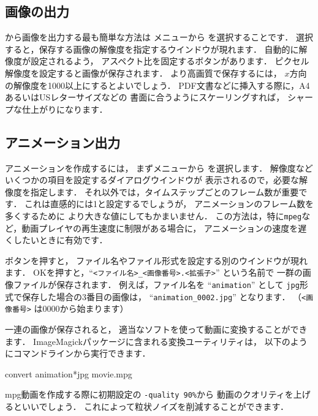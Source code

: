 \subsection{画像の出力}
\label{ssec:6.1.9}
から画像を出力する最も簡単な方法は
メニューから
%
%
を選択することです．
選択すると，保存する画像の解像度を指定するウインドウが現れます．
自動的に解像度が設定されるよう，
アスペクト比を固定するボタンがあります．
ピクセル解像度を設定すると画像が保存されます．
より高画質で保存するには，
$x$方向の解像度を1000以上にするとよいでしょう．
PDF文書などに挿入する際に，A4あるいはUSレターサイズなどの
書面に合うようにスケーリングすれば，
シャープな仕上がりになります．


\subsection{アニメーション出力}
\label{ssec:6.1.10}
アニメーションを作成するには，
まずメニューから
%
%
を選択します．
解像度などいくつかの項目を設定するダイアログウインドウが
表示されるので，必要な解像度を指定します．
それ以外では，タイムステップごとのフレーム数が重要です．
これは直感的には1と設定するでしょうが，
アニメーションのフレーム数を多くするために
より大きな値にしてもかまいません．
この方法は，特に\texttt{mpeg}など，動画プレイヤの再生速度に制限がある場合に，
アニメーションの速度を遅くしたいときに有効です．

ボタンを押すと，
ファイル名やファイル形式を設定する別のウインドウが現れます．
OKを押すと，``\verb|<ファイル名>_<画像番号>.<拡張子>|'' という名前で
一群の画像ファイルが保存されます．
例えば，ファイル名を ``\verb|animation|'' として
\texttt{jpg}形式で保存した場合の3番目の画像は，
``\verb|animation_0002.jpg|'' となります．
（\verb|<画像番号>| は0000から始まります）

一連の画像が保存されると，
適当なソフトを使って動画に変換することができます．
ImageMagickパッケージに含まれる変換ユーティリティは，
以下のようにコマンドラインから実行できます．
\begin{OFverbatim}[terminal]
convert animation*jpg movie.mpg
\end{OFverbatim}
mpg動画を作成する際に初期設定の \verb|-quality 90%|から
動画のクオリティを上げるといいでしょう．
これによって粒状ノイズを削減することができます．



